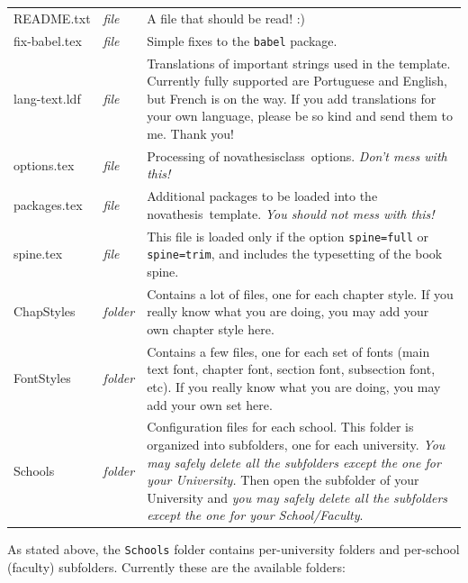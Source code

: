 \noindent
\bgroup
{}
\begin{tabularx}{\linewidth}{>{\ttfamily}l>{\itshape}l>{\upshape}X}
README.txt      & file    &
A file that should be read!  :)
\\
fix-babel.tex   & file    &
Simple fixes to the \texttt{babel} package.
\\
lang-text.ldf   & file    &
Translations of important strings used in the template.  Currently fully supported are Portuguese and English, but French is on the way.  If you add translations for your own language, please be so kind and send them to me. Thank you!
\\
options.tex     & file    &
Processing of \gls{novathesisclass}\ options.  \emph{Don't mess with this!}
\\
packages.tex    & file    &
Additional packages to be loaded into the \gls{novathesis}\ template. \emph{You should not mess with this!}
\\
spine.tex       & file    &
This file is loaded only if the option \texttt{spine=full} or \texttt{spine=trim}, and includes the typesetting of the book spine.
\\
ChapStyles      & folder  &
Contains a lot of files, one for each chapter style.  If you really know what you are doing, you may add your own chapter style here.
\\
FontStyles      & folder  &
Contains a few files, one for each set of fonts (main text font, chapter font, section font, subsection font, etc).  If you really know what you are doing, you may add your own set here.
\\
Schools         & folder  &
Configuration files for each school.  This folder is organized into subfolders, one for each university.  \emph{You may safely delete all the subfolders except the one for your University.}  Then open the subfolder of your University and \emph{you may safely delete all the subfolders except the one for your School/Faculty}.
\\
\end{tabularx}
\egroup

As stated above, the \texttt{Schools} folder contains per-university folders and per-school (faculty) subfolders.  Currently these are the available folders:

